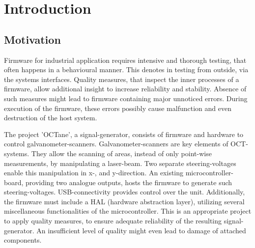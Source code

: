 \chapter{Introduction}
\label{cha:Introduction}

\section{Motivation}
Firmware for industrial application requires intensive and thorough testing, that often happens in a behavioural manner. This denotes in testing from outside, via the systems interfaces. Quality measures, that inspect the inner processes of a firmware, allow additional insight to increase reliability and stability. Absence of such measures might lead to firmware containing major unnoticed errors. During execution of the firmware, these errors possibly cause malfunction and even destruction of the host system.

The project 'OCTane', a signal-generator, consists of firmware and hardware to control galvanometer-scanners. Galvanometer-scanners are key elements of OCT-systems. They allow the scanning of areas, instead of only point-wise measurements, by manipulating a laser-beam. Two separate steering-voltages enable this manipulation in x-, and y-direction. An existing microcontroller-board, providing two analogue outputs, hosts the firmware to generate such steering-voltages. USB-connectivity provides control over the unit. Additionally, the firmware must include a HAL (hardware abstraction layer), utilizing several miscellaneous functionalities of the microcontroller. This is an appropriate project to apply quality measures, to ensure adequate reliability of the resulting signal-generator. An insufficient level of quality might even lead to damage of attached components.

